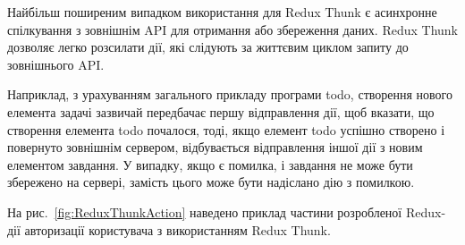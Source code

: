 Найбільш поширеним випадком використання для Redux Thunk є асинхронне спілкування з зовнішнім API для отримання або збереження даних. Redux Thunk дозволяє легко розсилати дії, які слідують за життєвим циклом запиту до зовнішнього API.

Наприклад, з урахуванням загального прикладу програми todo, створення нового елемента задачі зазвичай передбачає першу відправлення дії, щоб вказати, що створення елемента todo почалося, тоді, якщо елемент todo успішно створено і повернуто зовнішнім сервером, відбувається відправлення іншої дії з новим елементом завдання. У випадку, якщо є помилка, і завдання не може бути збережено на сервері, замість цього може бути надіслано дію з помилкою.

На рис.~\ref{fig:ReduxThunkAction} наведено приклад частини розробленої Redux-дії авторизації користувача з використанням Redux Thunk.
